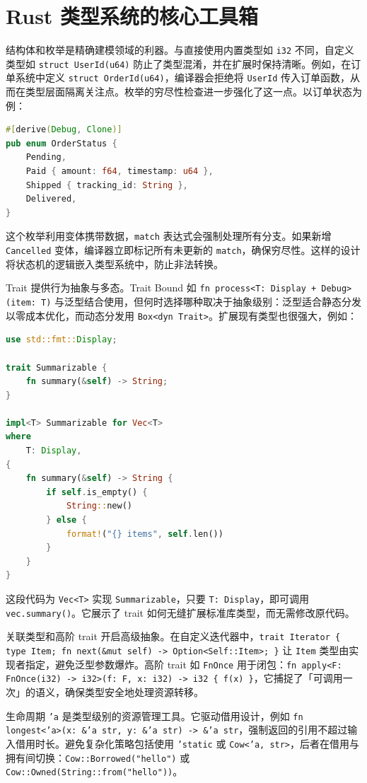 \chapter{Rust 类型系统的核心工具箱}
结构体和枚举是精确建模领域的利器。与直接使用内置类型如 \texttt{i32} 不同，自定义类型如 \texttt{struct UserId(u64)} 防止了类型混淆，并在扩展时保持清晰。例如，在订单系统中定义 \texttt{struct OrderId(u64)}，编译器会拒绝将 \texttt{UserId} 传入订单函数，从而在类型层面隔离关注点。枚举的穷尽性检查进一步强化了这一点。以订单状态为例：\par
\begin{lstlisting}[language=rust]
#[derive(Debug, Clone)]
pub enum OrderStatus {
    Pending,
    Paid { amount: f64, timestamp: u64 },
    Shipped { tracking_id: String },
    Delivered,
}
\end{lstlisting}
这个枚举利用变体携带数据，\texttt{match} 表达式会强制处理所有分支。如果新增 \texttt{Cancelled} 变体，编译器立即标记所有未更新的 \texttt{match}，确保穷尽性。这样的设计将状态机的逻辑嵌入类型系统中，防止非法转换。\par
Trait 提供行为抽象与多态。Trait Bound 如 \texttt{fn process<T: Display + Debug>(item: T)} 与泛型结合使用，但何时选择哪种取决于抽象级别：泛型适合静态分发以零成本优化，而动态分发用 \texttt{Box<dyn Trait>}。扩展现有类型也很强大，例如：\par
\begin{lstlisting}[language=rust]
use std::fmt::Display;

trait Summarizable {
    fn summary(&self) -> String;
}

impl<T> Summarizable for Vec<T>
where
    T: Display,
{
    fn summary(&self) -> String {
        if self.is_empty() {
            String::new()
        } else {
            format!("{} items", self.len())
        }
    }
}
\end{lstlisting}
这段代码为 \texttt{Vec<T>} 实现 \texttt{Summarizable}，只要 \texttt{T: Display}，即可调用 \texttt{vec.summary()}。它展示了 trait 如何无缝扩展标准库类型，而无需修改原代码。\par
关联类型和高阶 trait 开启高级抽象。在自定义迭代器中，\texttt{trait Iterator \{{} type Item; fn next(\&{}mut self) -> Option<Self::Item>; \}{}} 让 \texttt{Item} 类型由实现者指定，避免泛型参数爆炸。高阶 trait 如 \texttt{FnOnce} 用于闭包：\texttt{fn apply<F: FnOnce(i32) -> i32>(f: F, x: i32) -> i32 \{{} f(x) \}{}}，它捕捉了「可调用一次」的语义，确保类型安全地处理资源转移。\par
生命周期 \texttt{'a} 是类型级别的资源管理工具。它驱动借用设计，例如 \texttt{fn longest<'a>(x: \&{}'a str, y: \&{}'a str) -> \&{}'a str}，强制返回的引用不超过输入借用时长。避免复杂化策略包括使用 \texttt{'static} 或 \texttt{Cow<'a, str>}，后者在借用与拥有间切换：\texttt{Cow::Borrowed("hello")} 或 \texttt{Cow::Owned(String::from("hello"))}。\par
